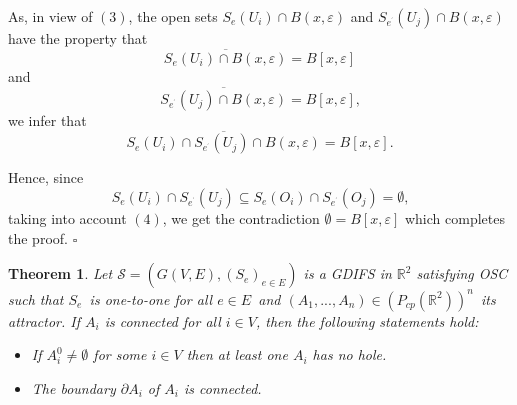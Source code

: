 \documentclass[a4paper,12pt,reqno]{amsart}
\numberwithin{equation}{section}
\newtheorem{theorem}{Theorem}[section]
\theoremstyle{definition}
\theoremstyle{remark}
\numberwithin{equation}{section}
\begin{document}
As, in view of $(3)$, the open sets $S_{e}(U_{i})\cap B(x,\varepsilon )$ and 
$S_{e^{^{\prime }}}(U_{j})\cap B(x,\varepsilon )$ have the property that 
\begin{equation*}
\overline{S_{e}(U_{i})\cap B(x,\varepsilon )}=B[x,\varepsilon ]
\end{equation*}%
and 
\begin{equation*}
\overline{S_{e^{^{\prime }}}(U_{j})\cap B(x,\varepsilon )}=B[x,\varepsilon ]%
\text{,}
\end{equation*}%
we infer that 
\begin{equation}
\overline{S_{e}(U_{i})\cap S_{e^{^{\prime }}}(U_{j})\cap B(x,\varepsilon )}%
=B[x,\varepsilon ]\text{.}  \tag{4}
\end{equation}

Hence, since 
\begin{equation*}
S_{e}(U_{i})\cap S_{e^{^{\prime }}}(U_{j})\subseteq S_{e}(O_{i})\cap
S_{e^{^{\prime }}}(O_{j})=\emptyset \text{,}
\end{equation*}%
taking into account $(4)$, we get the contradiction $\emptyset
=B[x,\varepsilon ]$ which completes the proof. $\square $
\begin{theorem}\label{Main}
    \textit{Let} $\mathcal{S}=(G(V,E),(S_{e})_{e\in E})$
\textit{is a GDIFS in} $\mathbb{R}^{2}$ \textit{satisfying OSC such that }$%
S_{e}$\textit{\ is one-to-one for all }$e\in E$\textit{\ and }$%
(A_{1},...,A_{n})\in (P_{cp}(\mathbb{R}^{2}))^{n}$\textit{\ its attractor.} If $A_i$ is connected for all $i\in V$, then the following statements hold:
    \begin{itemize}
        \item[(i)] If $A_{i}^0\ne \emptyset$ for some $i\in V$ then at least one $A_i$ has no hole.
        \item[(ii)] The boundary $\partial A_i$ of $A_i$ is connected.
    \end{itemize}
\end{theorem}
\end{document}
